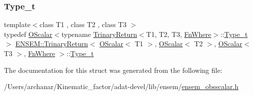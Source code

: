 \subsubsection{\texorpdfstring{Type\_t}{Type\_t}\hspace{0.1cm}{\footnotesize\ttfamily [3/3]}}
{\footnotesize\ttfamily template$<$class T1 , class T2 , class T3 $>$ \\
typedef \mbox{\hyperlink{classENSEM_1_1OScalar}{O\+Scalar}}$<$typename \mbox{\hyperlink{structENSEM_1_1TrinaryReturn}{Trinary\+Return}}$<$T1, T2, T3, \mbox{\hyperlink{structENSEM_1_1FnWhere}{Fn\+Where}}$>$\+::\mbox{\hyperlink{structENSEM_1_1TrinaryReturn_3_01OScalar_3_01T1_01_4_00_01OScalar_3_01T2_01_4_00_01OScalar_3_01T3_01_4_00_01FnWhere_01_4_a6b5cfd8880a0a52baef8bb62d3af1244}{Type\+\_\+t}}$>$ \mbox{\hyperlink{structENSEM_1_1TrinaryReturn}{E\+N\+S\+E\+M\+::\+Trinary\+Return}}$<$ \mbox{\hyperlink{classENSEM_1_1OScalar}{O\+Scalar}}$<$ T1 $>$, \mbox{\hyperlink{classENSEM_1_1OScalar}{O\+Scalar}}$<$ T2 $>$, \mbox{\hyperlink{classENSEM_1_1OScalar}{O\+Scalar}}$<$ T3 $>$, \mbox{\hyperlink{structENSEM_1_1FnWhere}{Fn\+Where}} $>$\+::\mbox{\hyperlink{structENSEM_1_1TrinaryReturn_3_01OScalar_3_01T1_01_4_00_01OScalar_3_01T2_01_4_00_01OScalar_3_01T3_01_4_00_01FnWhere_01_4_a6b5cfd8880a0a52baef8bb62d3af1244}{Type\+\_\+t}}}



The documentation for this struct was generated from the following file\+:\begin{DoxyCompactItemize}
\item 
/\+Users/archanar/\+Kinematic\+\_\+factor/adat-\/devel/lib/ensem/\mbox{\hyperlink{adat-devel_2lib_2ensem_2ensem__obsscalar_8h}{ensem\+\_\+obsscalar.\+h}}\end{DoxyCompactItemize}
